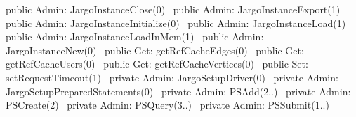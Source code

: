 public \LA{}Admin: JargoInstanceClose(0)~{\nwtagstyle{}}\RA{}
public \LA{}Admin: JargoInstanceExport(1)~{\nwtagstyle{}}\RA{}
public \LA{}Admin: JargoInstanceInitialize(0)~{\nwtagstyle{}}\RA{}
public \LA{}Admin: JargoInstanceLoad(1)~{\nwtagstyle{}}\RA{}
public \LA{}Admin: JargoInstanceLoadInMem(1)~{\nwtagstyle{}}\RA{}
public \LA{}Admin: JargoInstanceNew(0)~{\nwtagstyle{}}\RA{}
public \LA{}Get: getRefCacheEdges(0)~{\nwtagstyle{}}\RA{}
public \LA{}Get: getRefCacheUsers(0)~{\nwtagstyle{}}\RA{}
public \LA{}Get: getRefCacheVertices(0)~{\nwtagstyle{}}\RA{}
public \LA{}Set: setRequestTimeout(1)~{\nwtagstyle{}}\RA{}
private \LA{}Admin: JargoSetupDriver(0)~{\nwtagstyle{}}\RA{}
private \LA{}Admin: JargoSetupPreparedStatements(0)~{\nwtagstyle{}}\RA{}
private \LA{}Admin: PSAdd(2..)~{\nwtagstyle{}}\RA{}
private \LA{}Admin: PSCreate(2)~{\nwtagstyle{}}\RA{}
private \LA{}Admin: PSQuery(3..)~{\nwtagstyle{}}\RA{}
private \LA{}Admin: PSSubmit(1..)~{\nwtagstyle{}}\RA{}
\nwendcode{}\nwdocspar

